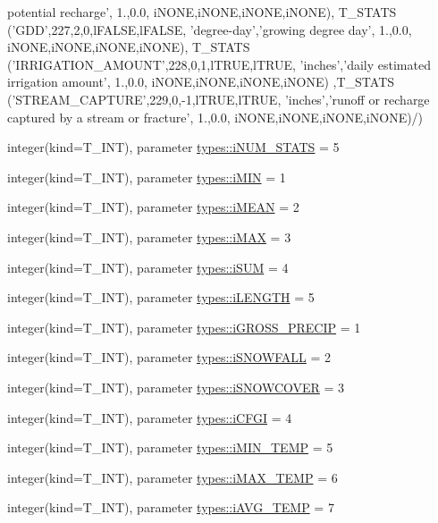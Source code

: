 \begin{DoxyCompactItemize}
potential recharge', 1.,0.0, iNONE,iNONE,iNONE,iNONE), T\_\-STATS ('GDD',227,2,0,lFALSE,lFALSE, 'degree-\/day','growing degree day', 1.,0.0, iNONE,iNONE,iNONE,iNONE), T\_\-STATS ('IRRIGATION\_\-AMOUNT',228,0,1,lTRUE,lTRUE, 'inches','daily estimated irrigation amount', 1.,0.0, iNONE,iNONE,iNONE,iNONE) ,T\_\-STATS ('STREAM\_\-CAPTURE',229,0,-\/1,lTRUE,lTRUE, 'inches','runoff or recharge captured by a stream or fracture', 1.,0.0, iNONE,iNONE,iNONE,iNONE)/)
\item 
integer(kind=T\_\-INT), parameter \hyperlink{namespacetypes_a4c56fb4b9e90eaa04e36102300d88ba6}{types::iNUM\_\-STATS} = 5
\item 
integer(kind=T\_\-INT), parameter \hyperlink{namespacetypes_a996356f311868440012a452bc3d0a323}{types::iMIN} = 1
\item 
integer(kind=T\_\-INT), parameter \hyperlink{namespacetypes_a65fde77ac5f489a0498cfd5cc6578bdf}{types::iMEAN} = 2
\item 
integer(kind=T\_\-INT), parameter \hyperlink{namespacetypes_a2f0945d479ed3cf3287563bd4acb0f85}{types::iMAX} = 3
\item 
integer(kind=T\_\-INT), parameter \hyperlink{namespacetypes_a0b92a69a1b38cb0319dfe59e72f8a7fc}{types::iSUM} = 4
\item 
integer(kind=T\_\-INT), parameter \hyperlink{namespacetypes_a91d9c66c291dee92fc0284fa06fb6f73}{types::iLENGTH} = 5
\item 
integer(kind=T\_\-INT), parameter \hyperlink{namespacetypes_a3c6dbb348b35ea04c6da1808e4eeb082}{types::iGROSS\_\-PRECIP} = 1
\item 
integer(kind=T\_\-INT), parameter \hyperlink{namespacetypes_a216378a3ebd8c66d245fc2aca380e6c7}{types::iSNOWFALL} = 2
\item 
integer(kind=T\_\-INT), parameter \hyperlink{namespacetypes_a14231f76d9ab4ada50ac11d2234209c3}{types::iSNOWCOVER} = 3
\item 
integer(kind=T\_\-INT), parameter \hyperlink{namespacetypes_a26dd912760d99d5d582693dd2aad18b5}{types::iCFGI} = 4
\item 
integer(kind=T\_\-INT), parameter \hyperlink{namespacetypes_a58eba3f16f91d9339380db844925820f}{types::iMIN\_\-TEMP} = 5
\item 
integer(kind=T\_\-INT), parameter \hyperlink{namespacetypes_a041c6ea18472c36d80d58d451635e4dc}{types::iMAX\_\-TEMP} = 6
\item 
integer(kind=T\_\-INT), parameter \hyperlink{namespacetypes_a11c906ff2073a4fbe3cf9425dce415ae}{types::iAVG\_\-TEMP} = 7
\item 

\end{DoxyCompactItemize}

